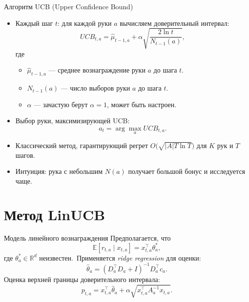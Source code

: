 \documentclass[10pt]{beamer}
\begin{document}
\begin{frame}{Алгоритм UCB (Upper Confidence Bound)}
  \begin{itemize}
    \item Каждый шаг $t$: для каждой руки $a$ вычисляем доверительный интервал:
    $$UCB_{t,a} = \hat{\mu}_{t-1,a} + \alpha\sqrt{\frac{2\ln t}{N_{t-1}(a)}},$$
    где
    \begin{itemize}
      \item $\hat{\mu}_{t-1,a}$ — среднее вознаграждение руки $a$ до шага $t$.
      \item $N_{t-1}(a)$ — число выборов руки $a$ до шага $t$.
      \item $\alpha$ — зачастую берут $\alpha=1$, \!может быть настроен.
    \end{itemize}
    \item Выбор руки, максимизирующей UCB:
    $$a_t = \arg\max_a UCB_{t,a}.$$  
    \item Классический метод, гарантирующий регрет $O\bigl(\sqrt{|A|T\ln T}\bigr)$ для $K$ рук и $T$ шагов.
    \item Интуиция: рука с небольшим $N(a)$ получает большой бонус и исследуется чаще.
  \end{itemize}
\end{frame}
\section{Метод LinUCB}
\begin{frame}{Модель линейного вознаграждения}
  Предполагается, что
  \[
    \mathbb{E}[r_{t,a}\mid x_{t,a}]=x_{t,a}^\top \theta^*_a,
  \]
  где $\theta^*_a\in\mathbb{R}^d$ неизвестен.\
  Применяется \emph{ridge regression} для оценки:
  \[
    \hat{\theta}_a=(D_a^\top D_a + I)^{-1} D_a^\top c_a.
  \]
  Оценка верхней границы доверительного интервала:
  \[
    p_{t,a}=x_{t,a}^\top \hat{\theta}_a + \alpha\sqrt{x_{t,a}^\top A_a^{-1} x_{t,a}}.
  \]
\end{frame}
\end{document}
